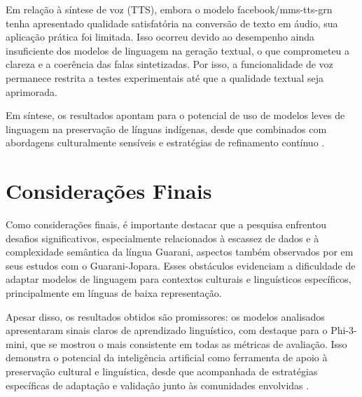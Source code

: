 \documentclass[12pt]{article}
\begin{document}
Em relação à síntese de voz (TTS), embora o modelo facebook/mms-tts-grn tenha apresentado qualidade satisfatória na conversão de texto em áudio, sua aplicação prática foi limitada. Isso ocorreu devido ao desempenho ainda insuficiente dos modelos de linguagem na geração textual, o que comprometeu a clareza e a coerência das falas sintetizadas. Por isso, a funcionalidade de voz permanece restrita a testes experimentais até que a qualidade textual seja aprimorada.

Em síntese, os resultados apontam para o potencial de uso de modelos leves de linguagem na preservação de línguas indígenas, desde que combinados com abordagens culturalmente sensíveis e estratégias de refinamento contínuo \cite{nagoudi2021indt5}.

\section{Considerações Finais}
Como considerações finais, é importante destacar que a pesquisa enfrentou desafios significativos, especialmente relacionados à escassez de dados e à complexidade semântica da língua Guarani, aspectos também observados por \cite{diaz2025building} em seus estudos com o Guarani-Jopara. Esses obstáculos evidenciam a dificuldade de adaptar modelos de linguagem para contextos culturais e linguísticos específicos, principalmente em línguas de baixa representação.

Apesar disso, os resultados obtidos são promissores: os modelos analisados apresentaram sinais claros de aprendizado linguístico, com destaque para o Phi-3-mini, que se mostrou o mais consistente em todas as métricas de avaliação. Isso demonstra o potencial da inteligência artificial como ferramenta de apoio à preservação cultural e linguística, desde que acompanhada de estratégias específicas de adaptação e validação junto às comunidades envolvidas \cite{deferia2024uso, cabral2016guarani}.






\end{document}
